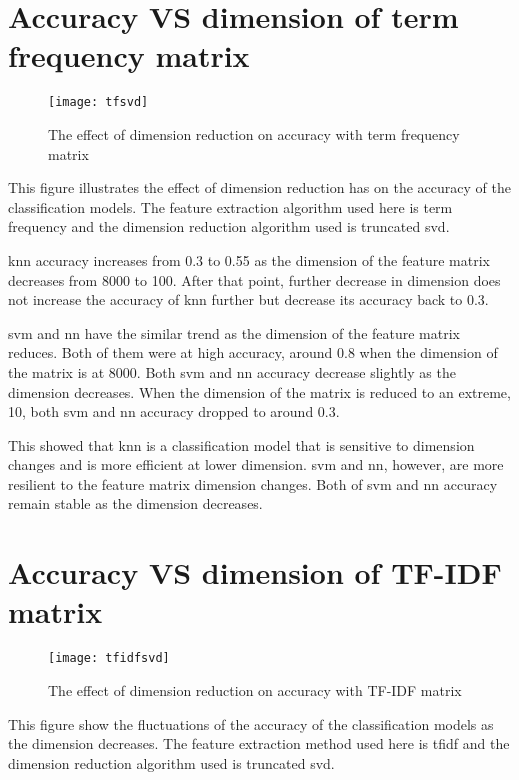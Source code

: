 \clearpage
\section{Accuracy VS dimension of term frequency matrix}
\begin{figure} [ht]
	\centering
	\texttt{[image: tfsvd]}
	\caption{The effect of dimension reduction on accuracy with term frequency matrix}
	\label{fig:freqCount}
\end{figure}

This figure illustrates the effect of dimension reduction has on the accuracy of the classification models. The feature extraction algorithm used here is term frequency and the dimension reduction algorithm used is truncated \ac{svd}.

\Ac{knn} accuracy increases from 0.3 to 0.55 as the dimension of the feature matrix decreases from 8000 to 100. After that point, further decrease in dimension does not increase the accuracy of \ac{knn} further but decrease its accuracy back to 0.3.

\Ac{svm} and \ac{nn} have the similar trend as the dimension of the feature matrix reduces. Both of them were at high accuracy, around 0.8 when the dimension of the matrix is at 8000. Both \ac{svm} and \ac{nn} accuracy decrease slightly as the dimension decreases. When the dimension of the matrix is reduced to an extreme, 10, both \ac{svm} and \ac{nn} accuracy dropped to around 0.3.

This showed that \ac{knn} is a classification model that is sensitive to dimension changes and is more efficient at lower dimension. \ac{svm} and \ac{nn}, however, are more resilient to the feature matrix dimension changes. Both of \ac{svm} and \ac{nn} accuracy remain stable as the dimension decreases.\\

\clearpage
\section{Accuracy VS dimension of TF-IDF matrix}
\begin{figure} [ht]
	\centering
	\texttt{[image: tfidfsvd]}
	\caption{The effect of dimension reduction on accuracy with TF-IDF matrix}
	\label{fig:freqCount}
\end{figure}

This figure show the fluctuations of the accuracy of the classification models as the dimension decreases. The feature extraction method used here is \ac{tfidf} and the dimension reduction algorithm used is truncated \ac{svd}.

